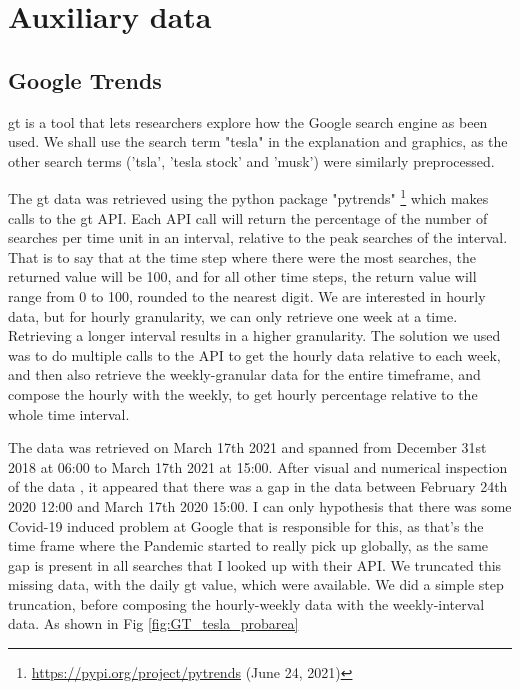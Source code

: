\section{Auxiliary data}
\subsection{Google Trends}
\acrfull{gt} is a tool that lets researchers explore how the Google search engine as been used. We shall use the search term "tesla" in the explanation and graphics, as the other search terms ('tsla', 'tesla stock' and 'musk') were similarly preprocessed.



The \acrlong{gt} data was retrieved using the \Gls{python} package "pytrends" \footnote{\url{https://pypi.org/project/pytrends} (June 24, 2021)} which makes calls to the \acrlong{gt} \Gls{API}. Each \Gls{API} call will return the percentage of the number of searches per time unit in an interval, relative to the peak searches of the interval. That is to say that at the time step where there were the most searches, the returned value will be 100, and for all other time steps, the return value will range from 0 to 100, rounded to the nearest digit.
We are interested in hourly data, but for hourly granularity, we can only retrieve one week at a time. Retrieving a longer interval results in a higher granularity. The solution we used was to do multiple calls to the \Gls{API} to get the hourly data relative to each week, and then also retrieve the weekly-granular data for the entire timeframe, and compose the hourly with the weekly, to get hourly percentage relative to the whole time interval.

The data was retrieved on March 17th 2021 and spanned from December 31st 2018 at 06:00 to March 17th 2021 at 15:00.
After visual and numerical inspection of the data %
, it appeared that there was a gap in the data between February 24th 2020 12:00 and March 17th 2020 15:00. I can only hypothesis that there was some Covid-19 induced problem at Google that is responsible for this, as that's the time frame where the Pandemic started to really pick up globally, as the same gap is present in all searches that I looked up with their \Gls{API}. 
We truncated this missing data, with the daily \acrshort{gt} value, which were available. We did a simple step truncation, before composing the hourly-weekly data with the weekly-interval data. As shown in Fig \ref{fig:GT_tesla_probarea}

